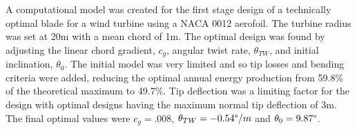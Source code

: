 \documentclass[11pt]{article}
\begin{document}
A computational model was created for the first stage design of a technically optimal blade for a wind turbine using a NACA 0012 aerofoil. The turbine radius was set at 20m with a mean chord of 1m. The optimal design was found by adjusting the linear chord gradient, $c_g$, angular twist rate, $\theta_{TW}$, and initial inclination, $\theta_0$. The initial model was very limited and so tip losses and bending criteria were added, reducing the optimal annual energy production from 59.8\% of the theoretical maximum to 49.7\%. Tip deflection was a limiting factor for the design with optimal designs having the maximum normal tip deflection of 3m. The final optimal values were $c_g = .008 $, $\theta_{TW} = -0.54 \degree /m$ and $\theta_0 = 9.87 \degree$.




\tableofcontents
\thispagestyle{empty}
\listoffigures
\listoftables






\end{document}
